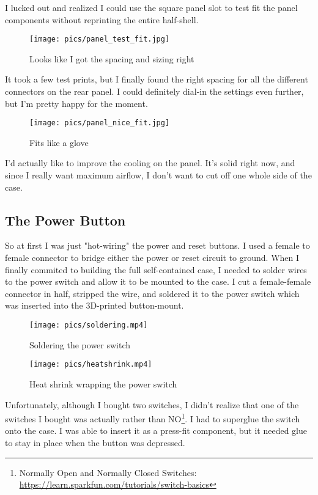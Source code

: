 \documentclass{article}
\begin{document}
I lucked out and realized I could use the square panel slot to test fit the panel components without reprinting the entire half-shell.

\begin{figure}[h]
\texttt{[image: pics/panel\_test\_fit.jpg]}
\caption{Looks like I got the spacing and sizing right}
\end{figure}

It took a few test prints, but I finally found the right spacing for all the different connectors on the rear panel. I could definitely dial-in the settings even further, but I'm pretty happy for the moment.

\begin{figure}[h]
\texttt{[image: pics/panel\_nice\_fit.jpg]}
\caption{Fits like a glove}
\end{figure}

I'd actually like to improve the cooling on the panel. It's solid right now, and since I really want maximum airflow, I don't want to cut off one whole side of the case.

\subsection{The Power Button}
So at first I was just "hot-wiring" the power and reset buttons. I used a female to female connector to bridge either the power or reset circuit to ground. When I finally commited to building the full self-contained case, I needed to solder wires to the power switch and allow it to be mounted to the case. I cut a female-female connector in half, stripped the wire, and soldered it to the power switch which was inserted into the 3D-printed button-mount.
\begin{figure}[h]
\texttt{[image: pics/soldering.mp4]}
\caption{Soldering the power switch}
\end{figure}

\begin{figure}[h]
\texttt{[image: pics/heatshrink.mp4]}
\caption{Heat shrink wrapping the power switch}
\end{figure}

Unfortunately, although I bought two switches, I didn't realize that one of the switches I bought was actually rather than NO\footnote{Normally Open and Normally Closed Switches: \url{https://learn.sparkfun.com/tutorials/switch-basics}}. I had to superglue the switch onto the case. I was able to insert it as a press-fit component, but it needed glue to stay in place when the button was depressed. 
\end{document}
